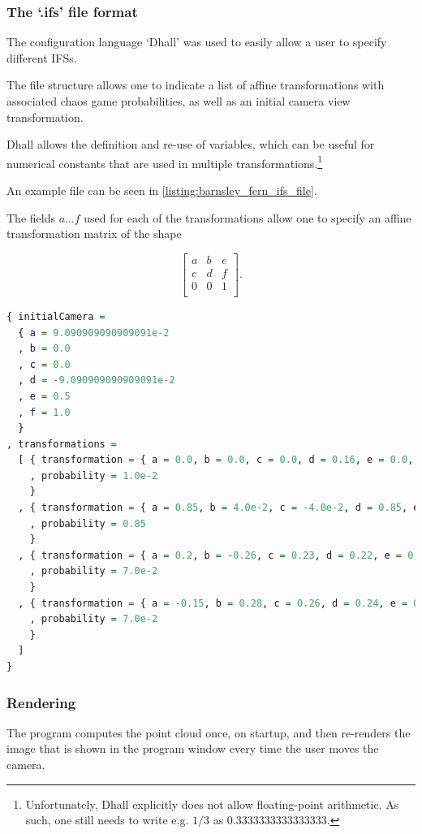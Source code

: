 \documentclass[11pt]{article}
\begin{document}
\subsubsection{The `.ifs' file format}
\label{sec:orgce371a3}

The configuration language `Dhall' \cite{gonzalez2019} was used to 
easily allow a user to specify different IFSs.

The file structure allows one to indicate a list of affine transformations with associated chaos game probabilities,
as well as an initial camera view transformation.

Dhall allows the definition and re-use of variables, which can be useful
for numerical constants that are used in multiple transformations.\footnote{Unfortunately, Dhall explicitly does not allow floating-point arithmetic.
As such, one still needs to write e.g. \(1/3\) as \(0.3333333333333333\).}

An example file can be seen in \autoref{listing:barnsley_fern_ifs_file}.

The fields \(a \ldots f\) used for each of the transformations allow one to specify an affine transformation matrix of the shape

$$\begin{bmatrix} a & b & e \\ c & d & f \\ 0 & 0 & 1 \\ \end{bmatrix}.$$


\begin{lstlisting}[float, language=Haskell, frame=single, breaklines=true, basicstyle=\scriptsize\tt, captionpos=b, caption={barnsley\_fern.ifs, representing \autoref{ifs:barnsley_fern}}, label={listing:barnsley_fern_ifs_file}]
{ initialCamera =
  { a = 9.090909090909091e-2
  , b = 0.0
  , c = 0.0
  , d = -9.090909090909091e-2
  , e = 0.5
  , f = 1.0
  }
, transformations =
  [ { transformation = { a = 0.0, b = 0.0, c = 0.0, d = 0.16, e = 0.0, f = 0.0 }
    , probability = 1.0e-2
    }
  , { transformation = { a = 0.85, b = 4.0e-2, c = -4.0e-2, d = 0.85, e = 0.0, f = 1.6 }
    , probability = 0.85
    }
  , { transformation = { a = 0.2, b = -0.26, c = 0.23, d = 0.22, e = 0.0, f = 1.6 }
    , probability = 7.0e-2
    }
  , { transformation = { a = -0.15, b = 0.28, c = 0.26, d = 0.24, e = 0.0, f = 0.44 }
    , probability = 7.0e-2
    }
  ]
}

\end{lstlisting}

\subsubsection{Rendering}
\label{sec:org8efef64}
The program computes the point cloud once, on startup, and then re-renders the image that is shown in the program window
every time the user moves the camera.
\end{document}
